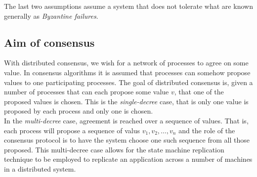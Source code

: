 
The last two assumptions assume a system that does not tolerate what are known generally as \emph{Byzantine failures}.




\subsection{Aim of consensus}

With distributed consensus, we wish for a network of processes to agree on some value. In consensus algorithms it is assumed that processes can somehow propose values to one participating processes. The goal of distributed consensus is, given a number of processes that can each propose some value $v$, that one of the proposed values is chosen. This is the \emph{single-decree} case, that is only one value is proposed by each process and only one is chosen. \\

In the \emph{multi-decree} case, agreement is reached over a sequence of values. That is, each process will propose a sequence of valus $v_1, v_2, \ldots, v_n$ and the role of the consensus protocol is to have the system choose one such sequence from all those proposed. This multi-decree case allows for the state machine replication technique to be employed to replicate an application across a number of machines in a distributed system.




